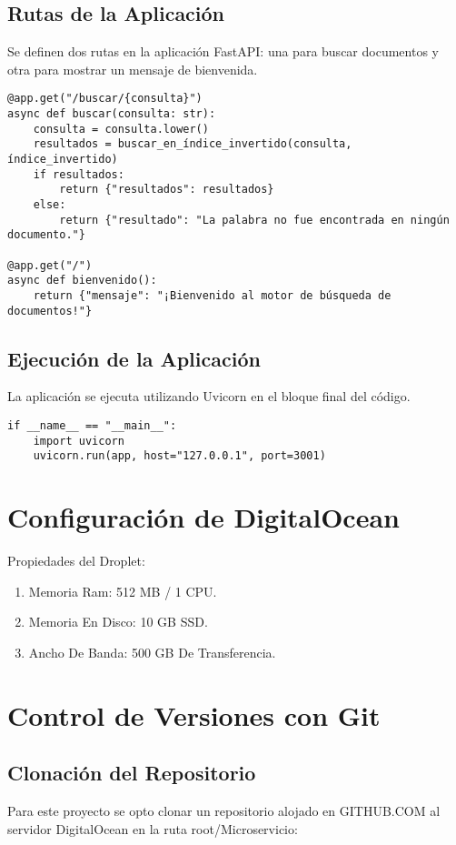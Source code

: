 \documentclass[journal]{IEEEtran}
\begin{document}
\subsection{Rutas de la Aplicación}
Se definen dos rutas en la aplicación FastAPI: una para buscar documentos y otra para mostrar un mensaje de bienvenida.

\begin{lstlisting}[style=custompython]
@app.get("/buscar/{consulta}")
async def buscar(consulta: str):
    consulta = consulta.lower()
    resultados = buscar_en_índice_invertido(consulta, índice_invertido)
    if resultados:
        return {"resultados": resultados}
    else:
        return {"resultado": "La palabra no fue encontrada en ningún documento."}

@app.get("/")
async def bienvenido():
    return {"mensaje": "¡Bienvenido al motor de búsqueda de documentos!"}
\end{lstlisting}

\subsection{Ejecución de la Aplicación}
La aplicación se ejecuta utilizando Uvicorn en el bloque final del código.

\begin{lstlisting}[style=custompython]
if __name__ == "__main__":
    import uvicorn
    uvicorn.run(app, host="127.0.0.1", port=3001)
\end{lstlisting}

\section{Configuración de DigitalOcean}
Propiedades del Droplet:
\begin{enumerate}
    \item Memoria Ram: 512 MB / 1 CPU.
     \item Memoria En Disco: 10 GB SSD.
    \item Ancho De Banda: 500 GB De Transferencia.
\end{enumerate}

\section{Control de Versiones con Git}

\subsection{Clonación del Repositorio}
Para este proyecto se opto clonar un repositorio alojado en GITHUB.COM al servidor DigitalOcean en la ruta root/Microservicio:
\end{document}
